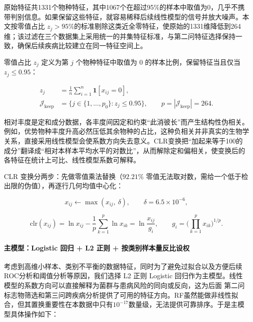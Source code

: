\documentclass{../../latex/templates/mcm-paper}
\begin{document}
原始特征共1331个物种特征，其中1067个在超过95\%的样本中取值为0，几乎不携带判别信息。如果保留这些特征，就容易稀释后续线性模型的信号并放大噪声。本文按零值占比 $z_j>95\%$的标准剔除这类近全零特征，使原始的1331维降低到264维；该过滤在三个数据集上采用统一的并集特征标准，与第二问特征选择保持一致，确保后续疾病比较建立在同一特征空间上。

零值占比 $z_j$ 定义为第 $j$ 个物种特征中取值为 0 的样本比例，保留特征当且仅当 $z_j \le 0.95$：

\begin{equation}
\begin{aligned}
  z_j &= \frac{1}{n}\sum_{i=1}^{n}\mathbf{1}[x_{ij}=0], \\
  \mathcal{J}_{\text{keep}} &= \big\{ j \in \{1,\dots,p_0\} : z_j \le 0.95 \big\},
  \qquad p = |\mathcal{J}_{\text{keep}}| = 264.
\end{aligned}
\label{eq:s1-filter}
\end{equation}

相对丰度是定和成分数据，各丰度间因定和约束“此消彼长”而产生结构性伪相关。例如，优势物种丰度升高必然压低其余物种的占比，这种负相关并非真实的生物学关系，直接采用线性模型会使系数方向失去意义。CLR变换把“加起来等于100的成分”翻译成“相对本样本平均水平的对数比”，从而解除定和偏相关，使变换后的各特征在统计上可比、线性模型系数可解释。

CLR 变换分两步：先做零值乘法替换（$92.21\%$ 零值无法取对数，需给一个低于检出限的伪值），再逐行几何均值中心化：

\begin{equation}
x_{ij} \leftarrow \max(x_{ij},\ \delta),
  \qquad
  \delta = 6.5\times10^{-6},
\label{eq:s1-zeroreplace}
\end{equation}

\begin{equation}
\mathrm{clr}(x_{ij}) = \ln x_{ij} - \frac{1}{p}\sum_{k=1}^{p}\ln x_{ik}
  = \ln\frac{x_{ij}}{g_i},
  \qquad
  g_i = \Big(\prod_{k=1}^{p} x_{ik}\Big)^{1/p}.
\label{eq:s1-clr}
\end{equation}

\paragraph{主模型：Logistic 回归 + L2 正则 + 按类别样本量反比设权}

考虑到高维小样本、类别不平衡的数据特征，同时为了避免过拟合以及方便后续ROC分析和阈值分析等原因，我们选择 L2 正则 Logistic 回归作为主模型。线性模型的系数方向可以直接解释为菌群与患病风险的同向或反向，这为后面 第二问标志物筛选和第三问跨疾病分析提供了可用的特征方向。RF虽然能做非线性拟合，但其置换重要性在本数据中只有$10^{-17}$数量级，无法提供可靠排序。于是主模型具体操作如下：
\end{document}
